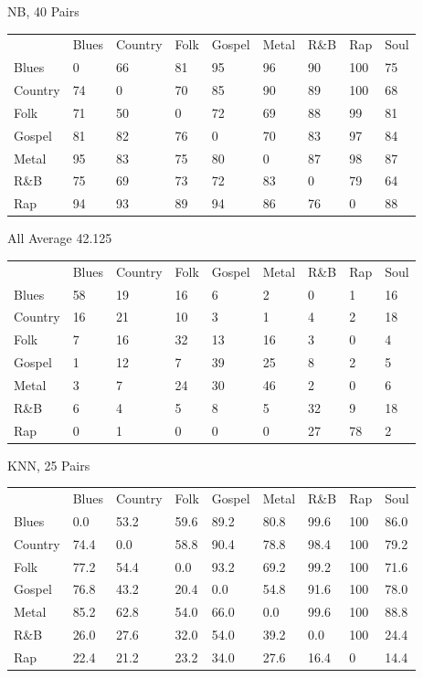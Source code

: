 \documentclass[a4paper,oneside]{article}
\begin{document}
NB, 40
Pairs
\begin{table}
\begin{tabular}{|l||*{8}{l|}} \hline
 & Blues & Country & Folk & Gospel & Metal & R\&B & Rap & Soul \\ \hhline{|=||*{8}{=|}}
Blues & 0 & 66 & 81 & 95 & 96 & 90 & 100 & 75 \\ \hline
Country & 74 & 0 & 70 & 85 & 90 & 89 & 100 & 68 \\ \hline
Folk & 71 & 50 & 0 & 72 & 69 & 88 & 99 & 81 \\ \hline
Gospel & 81 & 82 & 76 & 0 & 70 & 83 & 97 & 84 \\ \hline
Metal & 95 & 83 & 75 & 80 & 0 & 87 & 98 & 87 \\ \hline
R\&B & 75 & 69 & 73 & 72 & 83 & 0 & 79 & 64 \\ \hline
Rap & 94 & 93 & 89 & 94 & 86 & 76 & 0 & 88 \\ \hline
\end{tabular}
\end{table}

All
Average 42.125
\begin{table}
\begin{tabular}{|l||*{8}{l|}} \hline
 & Blues & Country & Folk & Gospel & Metal & R\&B & Rap & Soul \\ \hhline{|=||*{8}{=|}}
Blues & 58 & 19 & 16 & 6 & 2 & 0 & 1 & 16 \\ \hline
Country & 16 & 21 & 10 & 3 & 1 & 4 & 2 & 18 \\ \hline
Folk & 7 & 16 & 32 & 13 & 16 & 3 & 0 & 4 \\ \hline
Gospel & 1 & 12 & 7 & 39 & 25 & 8 & 2 & 5 \\ \hline
Metal & 3 & 7 & 24 & 30 & 46 & 2 & 0 & 6 \\ \hline
R\&B & 6 & 4 & 5 & 8 & 5 & 32 & 9 & 18 \\ \hline
Rap & 0 & 1 & 0 & 0 & 0 & 27 & 78 & 2 \\ \hline
\end{tabular}
\end{table}

KNN, 25
Pairs
\begin{table}
\begin{tabular}{|l||*{8}{l|}} \hline
 & Blues & Country & Folk & Gospel & Metal & R\&B & Rap & Soul \\ \hhline{|=||*{8}{=|}}
Blues & 0.0 & 53.2 & 59.6 & 89.2 & 80.8 & 99.6 & 100 & 86.0 \\ \hline
Country & 74.4 & 0.0 & 58.8 & 90.4 & 78.8 & 98.4 & 100 & 79.2 \\ \hline
Folk & 77.2 & 54.4 & 0.0 & 93.2 & 69.2 & 99.2 & 100 & 71.6 \\ \hline
Gospel & 76.8 & 43.2 & 20.4 & 0.0 & 54.8 & 91.6 & 100 & 78.0 \\ \hline
Metal & 85.2 & 62.8 & 54.0 & 66.0 & 0.0 & 99.6 & 100 & 88.8 \\ \hline
R\&B & 26.0 & 27.6 & 32.0 & 54.0 & 39.2 & 0.0 & 100 & 24.4 \\ \hline
Rap & 22.4 & 21.2 & 23.2 & 34.0 & 27.6 & 16.4 & 0 & 14.4 \\ \hline
\end{tabular}
\end{table}
\end{document}
